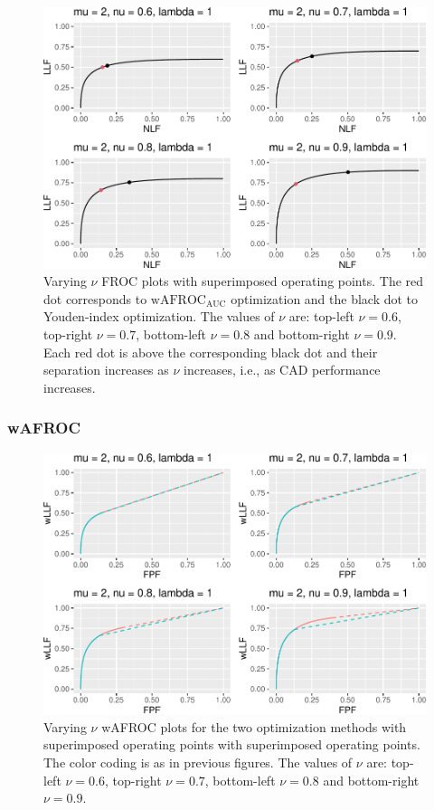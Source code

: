 \documentclass[
]{book}
\begin{document}
\begin{figure}
\centering
\includegraphics{21-optim-op-point_files/figure-latex/optim-op-point-vary-nu-froc-1.pdf}
\caption{\label{fig:optim-op-point-vary-nu-froc}Varying \(\nu\) FROC plots with superimposed operating points. The red dot corresponds to \(\text{wAFROC}_\text{AUC}\) optimization and the black dot to Youden-index optimization. The values of \(\nu\) are: top-left \(\nu = 0.6\), top-right \(\nu = 0.7\), bottom-left \(\nu = 0.8\) and bottom-right \(\nu = 0.9\). Each red dot is above the corresponding black dot and their separation increases as \(\nu\) increases, i.e., as CAD performance increases.}
\end{figure}

\hypertarget{wafroc-3}{%
\subsubsection{wAFROC}\label{wafroc-3}}

\begin{figure}
\centering
\includegraphics{21-optim-op-point_files/figure-latex/optim-op-point-vary-nu-wafroc-1.pdf}
\caption{\label{fig:optim-op-point-vary-nu-wafroc}Varying \(\nu\) wAFROC plots for the two optimization methods with superimposed operating points with superimposed operating points. The color coding is as in previous figures. The values of \(\nu\) are: top-left \(\nu = 0.6\), top-right \(\nu = 0.7\), bottom-left \(\nu = 0.8\) and bottom-right \(\nu = 0.9\).}
\end{figure}
\end{document}
